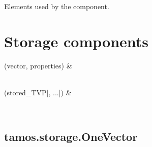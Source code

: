 \documentclass[letterpaper,10pt,english]{sphinxmanual}
\begin{document}
\begin{fulllineitems}
\begin{fulllineitems}
\end{fulllineitems}


\begin{fulllineitems}
\label{\detokenize{generated/tamos.production.Pump:tamos.production.Pump.used_elements}}
\pysigstartsignatures
{}
\pysigstopsignatures
\sphinxAtStartPar
Elements used by the component.

\end{fulllineitems}


\end{fulllineitems}


\sphinxstepscope


\chapter{Storage components}
\label{\detokenize{storage_components:storage-components}}\label{\detokenize{storage_components::doc}}

\begin{savenotes}\sphinxattablestart
\centering
\begin{tabulary}{\linewidth}[t]{}
\hline

\sphinxAtStartPar
{\hyperref[\detokenize{generated/tamos.storage.OneVector:tamos.storage.OneVector}]{}}(vector, properties)
&
\sphinxAtStartPar

\\
\hline
\sphinxAtStartPar
{\hyperref[\detokenize{generated/tamos.storage.Thermocline:tamos.storage.Thermocline}]{}}(stored\_TVP{[}, ...{]})
&
\sphinxAtStartPar

\\
\hline
\end{tabulary}
\par
\sphinxattableend\end{savenotes}

\sphinxstepscope


\section{tamos.storage.OneVector}
\label{\detokenize{generated/tamos.storage.OneVector:tamos-storage-onevector}}\label{\detokenize{generated/tamos.storage.OneVector::doc}}
\end{document}
